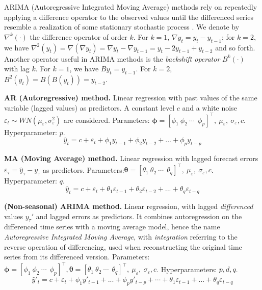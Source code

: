 ARIMA (Autoregressive Integrated Moving Average) methods \cite{box1970distribution} rely on repeatedly applying a difference operator to the observed values until the differenced series resemble a realization of some stationary stochastic process \cite{brockwell1990methods}.
We denote by $\nabla^k(\cdot)$ the difference operator of order $k$. For $k=1$, $\nabla y_t = y_t - y_{t-1}$; for $k=2$, we have $\nabla^2(y_t) = \nabla(\nabla y_t) = \nabla y_t - \nabla y_{t-1} = y_t -2y_{t-1} + y_{t-2}$  and so forth.
Another operator useful in ARIMA methods is the \textit{backshift operator} $B^k(\cdot)$ with lag $k$. For $k=1$, we have $B y_t = y_{t-1}$. For $k=2$, $B^2(y_t) = B(B(y_t)) = y_{t-2}$.

\vspace{1em}
\noindent
\textbf{AR (Autoregressive) method.}  Linear regression with past values of the same variable (lagged values) as predictors. A constant level $c$ and a white noise $\varepsilon_t \sim WN(\mu_\varepsilon, \sigma^2_\varepsilon)$ are considered. Parameters: $\boldsymbol{\phi} = [\phi_1 \ \phi_2 \ \cdots \ \ \phi_p]^\top, \ \mu_\varepsilon, \ \sigma_\varepsilon, c$. Hyperparameter: $p$.
\begin{equation}\label{eq:ar}
\hat{y}_t = c + \varepsilon_t + \phi_1 y_{t-1} + \phi_2 y_{t-2} + ... + \phi_p y_{t-p}
\end{equation}

\noindent
\textbf{MA (Moving Average) method.} Linear regression with lagged forecast errors $\varepsilon_\tau = \hat{y}_\tau - y_\tau$ as predictors. Parameters:$\boldsymbol{\theta} = [\theta_1 \ \theta_2 \ \cdots \ \ \theta_q]^\top, \ \mu_\varepsilon, \ \sigma_\varepsilon, c$. Hyperparameter: $q$.
\begin{equation}\label{eq:ma}
    \hat{y}_t = c + \varepsilon_{t} + \theta_1 \varepsilon_{t-1} + \theta_2 \varepsilon_{t-2} + ... + \theta_q \varepsilon_{t-q}
\end{equation}

\noindent
\textbf{(Non-seasonal) ARIMA method.} Linear regression, with lagged \textit{differenced} values $y_\tau'$ and lagged errors as predictors. It combines autoregression on the differenced time series with a moving average model, hence the name \textit{Autoregressive Integrated Moving Average}, with \textit{integration} referring to the reverse operation of differencing, used when reconstructing the original time series from its differenced version. Parameters:   $\boldsymbol{\phi} = [\phi_1 \ \phi_2 \ \cdots \ \ \phi_p]^\top,\boldsymbol{\theta} = [\theta_1 \ \theta_2 \ \cdots \ \ \theta_q]^\top, \ \mu_\varepsilon, \ \sigma_\varepsilon, c$. Hyperparameters: $p, d, q$.
\begin{equation}\label{eq:arima}
\hat{y}'_t = c + \varepsilon_t + \phi_1 y'_{t-1} + ... + \phi_p y'_{t-p} + \cdots + \theta_1 \varepsilon_{t-1} + ... + \theta_q \varepsilon_{t-q}
\end{equation}

